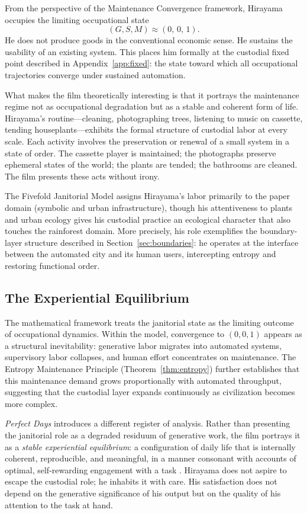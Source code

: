 \documentclass[12pt,a4paper]{article}
\theoremstyle{plain}
\theoremstyle{definition}
\theoremstyle{remark}
\begin{document}
From the perspective of the Maintenance Convergence framework, Hirayama
occupies the limiting occupational state
\[
(G,S,M) \approx (0,\, 0,\, 1).
\]
He does not produce goods in the conventional economic sense.  He sustains
the usability of an existing system.  This places him formally at the
custodial fixed point described in Appendix~\ref{app:fixed}: the state
toward which all occupational trajectories converge under sustained
automation.

What makes the film theoretically interesting is that it portrays the
maintenance regime not as occupational degradation but as a stable and
coherent form of life.  Hirayama's routine---cleaning, photographing trees,
listening to music on cassette, tending houseplants---exhibits the formal
structure of custodial labor at every scale.  Each activity involves the
preservation or renewal of a small system in a state of order.  The cassette
player is maintained; the photographs preserve ephemeral states of the world;
the plants are tended; the bathrooms are cleaned.  The film presents these
acts without irony.

The Fivefold Janitorial Model assigns Hirayama's labor primarily to the
paper domain (symbolic and urban infrastructure), though his attentiveness to
plants and urban ecology gives his custodial practice an ecological
character that also touches the rainforest domain.  More precisely, his
role exemplifies the boundary-layer structure described in
Section~\ref{sec:boundaries}: he operates at the interface between the
automated city and its human users, intercepting entropy and restoring
functional order.

\subsection{The Experiential Equilibrium}

The mathematical framework treats the janitorial state as the limiting
outcome of occupational dynamics.  Within the model, convergence to
$(0,0,1)$ appears as a structural inevitability: generative labor migrates
into automated systems, supervisory labor collapses, and human effort
concentrates on maintenance.  The Entropy Maintenance Principle
(Theorem~\ref{thm:entropy}) further establishes that this maintenance demand
grows proportionally with automated throughput, suggesting that the custodial
layer expands continuously as civilization becomes more complex.

\emph{Perfect Days} introduces a different register of analysis.  Rather than
presenting the janitorial role as a degraded residuum of generative work, the
film portrays it as a \emph{stable experiential equilibrium}: a configuration
of daily life that is internally coherent, reproducible, and meaningful, in
a manner consonant with accounts of optimal, self-rewarding engagement with
a task \cite{csikszentmihalyi1990}.  Hirayama does not aspire to escape the custodial role; he inhabits it with
care.  His satisfaction does not depend on the generative significance of his
output but on the quality of his attention to the task at hand.
\end{document}
